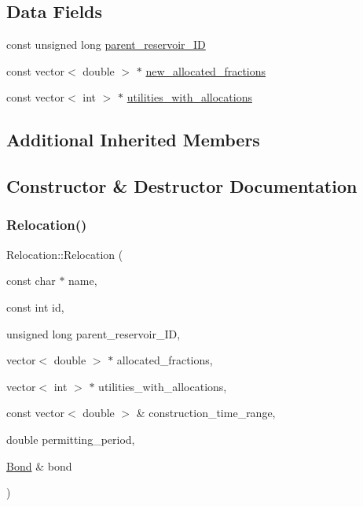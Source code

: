 \subsection*{Data Fields}
\begin{DoxyCompactItemize}
\item 
const unsigned long \mbox{\hyperlink{classRelocation_a61282254064f00641aaec667a7eb0652_a61282254064f00641aaec667a7eb0652}{parent\+\_\+reservoir\+\_\+\+ID}}
\item 
const vector$<$ double $>$ $\ast$ \mbox{\hyperlink{classRelocation_acc95d1be560fed2b4a1b4b2ae605ae67_acc95d1be560fed2b4a1b4b2ae605ae67}{new\+\_\+allocated\+\_\+fractions}}
\item 
const vector$<$ int $>$ $\ast$ \mbox{\hyperlink{classRelocation_ae426f390487b6b67f19bfbf556c922c2_ae426f390487b6b67f19bfbf556c922c2}{utilities\+\_\+with\+\_\+allocations}}
\end{DoxyCompactItemize}
\subsection*{Additional Inherited Members}


\subsection{Constructor \& Destructor Documentation}
\mbox{\label{classRelocation_abeada1f0c797d8992c1e6a200b571574_abeada1f0c797d8992c1e6a200b571574}} 
\subsubsection{\texorpdfstring{Relocation()}{Relocation()}\hspace{0.1cm}{\footnotesize\ttfamily [1/2]}}
{\footnotesize\ttfamily Relocation\+::\+Relocation (\begin{DoxyParamCaption}\item[{const char $\ast$}]{name,  }\item[{const int}]{id,  }\item[{unsigned long}]{parent\+\_\+reservoir\+\_\+\+ID,  }\item[{vector$<$ double $>$ $\ast$}]{allocated\+\_\+fractions,  }\item[{vector$<$ int $>$ $\ast$}]{utilities\+\_\+with\+\_\+allocations,  }\item[{const vector$<$ double $>$ \&}]{construction\+\_\+time\+\_\+range,  }\item[{double}]{permitting\+\_\+period,  }\item[{\mbox{\hyperlink{classBond}{Bond}} \&}]{bond }\end{DoxyParamCaption})}

